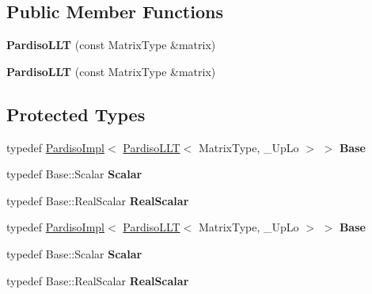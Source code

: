 \subsection*{Public Member Functions}
\begin{DoxyCompactItemize}
\item 
\mbox{\label{class_eigen_1_1_pardiso_l_l_t_a001cc4fc6bc3d11bf0d18fb8950029fe}} 
{\bfseries Pardiso\+L\+LT} (const Matrix\+Type \&matrix)
\item 
\mbox{\label{class_eigen_1_1_pardiso_l_l_t_a001cc4fc6bc3d11bf0d18fb8950029fe}} 
{\bfseries Pardiso\+L\+LT} (const Matrix\+Type \&matrix)
\end{DoxyCompactItemize}
\subsection*{Protected Types}
\begin{DoxyCompactItemize}
\item 
\mbox{\label{class_eigen_1_1_pardiso_l_l_t_a2db30d3b0a2bc5836ca565cd5352483b}} 
typedef \hyperlink{class_eigen_1_1_pardiso_impl}{Pardiso\+Impl}$<$ \hyperlink{class_eigen_1_1_pardiso_l_l_t}{Pardiso\+L\+LT}$<$ Matrix\+Type, \+\_\+\+Up\+Lo $>$ $>$ {\bfseries Base}
\item 
\mbox{\label{class_eigen_1_1_pardiso_l_l_t_af01f78d498ca862dc922e85308a9fb99}} 
typedef Base\+::\+Scalar {\bfseries Scalar}
\item 
\mbox{\label{class_eigen_1_1_pardiso_l_l_t_ae1d2fdefc5f542214f6c374b1037e020}} 
typedef Base\+::\+Real\+Scalar {\bfseries Real\+Scalar}
\item 
\mbox{\label{class_eigen_1_1_pardiso_l_l_t_a2db30d3b0a2bc5836ca565cd5352483b}} 
typedef \hyperlink{class_eigen_1_1_pardiso_impl}{Pardiso\+Impl}$<$ \hyperlink{class_eigen_1_1_pardiso_l_l_t}{Pardiso\+L\+LT}$<$ Matrix\+Type, \+\_\+\+Up\+Lo $>$ $>$ {\bfseries Base}
\item 
\mbox{\label{class_eigen_1_1_pardiso_l_l_t_af01f78d498ca862dc922e85308a9fb99}} 
typedef Base\+::\+Scalar {\bfseries Scalar}
\item 
\mbox{\label{class_eigen_1_1_pardiso_l_l_t_ae1d2fdefc5f542214f6c374b1037e020}} 
typedef Base\+::\+Real\+Scalar {\bfseries Real\+Scalar}
\end{DoxyCompactItemize}

